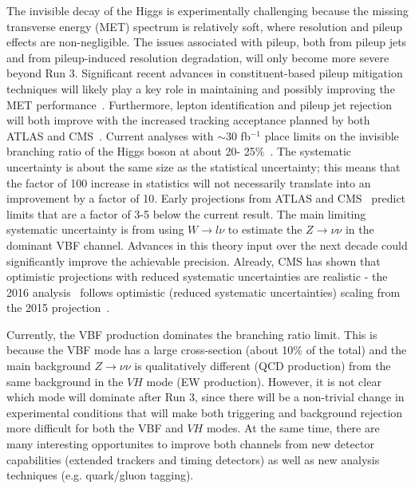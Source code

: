 \documentclass[../report.tex]{subfiles}
\begin{document}
The invisible decay of the Higgs is experimentally challenging because the missing transverse energy (MET) spectrum is relatively soft, where resolution and pileup effects are non-negligible.  The issues associated with pileup, both from pileup jets and from pileup-induced resolution degradation, will only become more severe beyond Run 3.  Significant recent advances in constituent-based pileup mitigation techniques will likely play a key role in maintaining and possibly improving the MET performance~\cite{Cacciari:2014gra,Bertolini:2014bba,Berta:2014eza,Komiske:2017ubm}.  Furthermore, lepton identification and pileup jet rejection will both improve with the increased tracking acceptance planned by both ATLAS and CMS~\cite{Klein:2017nke,Collaboration:2283187,Collaboration:2283189,Collaboration:2293646,Collaboration:2017mtb,Collaboration:2285585}. Current analyses with $\sim 30$ fb$^{-1}$ place limits on the invisible branching ratio of the Higgs boson at about 20- 25\%~\cite{Khachatryan:2016whc,Aad:2015pla,Aaboud:2017bja,Aad:2015txa,Sirunyan:2018owy,Aaboud:2018sfi}.  The systematic uncertainty is about the same size as the statistical uncertainty; this means that the factor of 100 increase in statistics will not necessarily translate into an improvement by a factor of 10.  Early projections from ATLAS and CMS~\cite{CMS-PAS-FTR-16-002,ATL-PHYS-PUB-2013-014} predict limits that are a factor of 3-5 below the current result. The main limiting systematic uncertainty is from using $W\rightarrow l\nu$ to estimate the $Z\rightarrow \nu\nu$ in the dominant VBF channel. Advances in this theory input over the next decade could significantly improve the achievable precision. Already, CMS has shown that optimistic projections with reduced systematic uncertainties are realistic - the 2016 analysis~\cite{Sirunyan:2018owy} follows optimistic (reduced systematic uncertainties) scaling from the 2015 projection~\cite{CMS-PAS-FTR-16-002}.

Currently, the VBF production dominates the branching ratio limit.  This is because the VBF mode has a large cross-section (about 10\% of the total) and the main background $Z\rightarrow\nu\nu$ is qualitatively different (QCD production) from the same background in the $VH$ mode (EW production).  However, it is not clear which mode will dominate after Run 3, since there will be a non-trivial change in experimental conditions that will make both triggering and background rejection more difficult for both the VBF and $VH$ modes.  At the same time, there are many interesting opportunites to improve both channels from new detector capabilities (extended trackers and timing detectors) as well as new analysis techniques (e.g. quark/gluon tagging).
\end{document}
